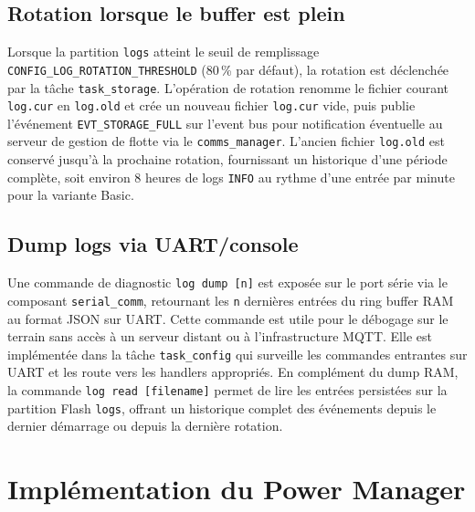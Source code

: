 \subsection{Rotation lorsque le buffer est plein}
\label{subsec:logrot}

Lorsque la partition \texttt{logs} atteint le seuil de remplissage
\texttt{CONFIG\_LOG\_ROTATION\_THRESHOLD} (80\,\% par défaut),
la rotation est déclenchée par la tâche \texttt{task\_storage}.
L'opération de rotation renomme le fichier courant \texttt{log.cur}
en \texttt{log.old} et crée un nouveau fichier \texttt{log.cur} vide,
puis publie l'événement \texttt{EVT\_STORAGE\_FULL} sur l'event bus
pour notification éventuelle au serveur de gestion de flotte via le
\texttt{comms\_manager}. L'ancien fichier \texttt{log.old} est
conservé jusqu'à la prochaine rotation, fournissant un historique
d'une période complète, soit environ 8 heures de logs \texttt{INFO}
au rythme d'une entrée par minute pour la variante Basic.

\subsection{Dump logs via UART/console}
\label{subsec:logdump}

Une commande de diagnostic \texttt{log dump [n]} est exposée sur le
port série via le composant \texttt{serial\_comm}, retournant les
\texttt{n} dernières entrées du ring buffer RAM au format JSON sur
UART. Cette commande est utile pour le débogage sur le terrain sans
accès à un serveur distant ou à l'infrastructure MQTT. Elle est
implémentée dans la tâche \texttt{task\_config} qui surveille les
commandes entrantes sur UART et les route vers les handlers appropriés.
En complément du dump RAM, la commande \texttt{log read [filename]}
permet de lire les entrées persistées sur la partition Flash \texttt{logs},
offrant un historique complet des événements depuis le dernier
démarrage ou depuis la dernière rotation.

\section{Implémentation du Power Manager}
\label{sec:power_impl}

